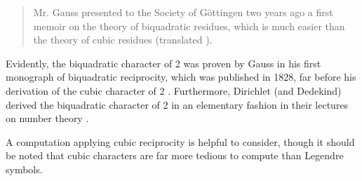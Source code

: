 \documentclass[10pt]{amsart}
\theoremstyle{plain}
\theoremstyle{definition}
\theoremstyle{remark}
\numberwithin{equation}{section}
\begin{document}
\begin{quote}
    Mr. Gauss presented to the Society of Göttingen two years ago a first memoir on the theory of biquadratic residues, which is much easier than the theory of cubic residues \cite{Jacobi1827-yn} (translated \cite[pg. 224]{lemmermeyer2000reciprocity}).
\end{quote}

Evidently, the biquadratic character of 2 was proven by Gauss in his first monograph of biquadratic reciprocity, which was published in 1828, far before his derivation of the cubic character of 2 \cite{gauss1876biquadraticmono}. Furthermore, Dirichlet (and Dedekind) derived the biquadratic character of 2 in an elementary fashion in their lectures on number theory \cite{dirichlet1863vorlesungen}.

\indent A computation applying cubic reciprocity is helpful to consider, though it should be noted that cubic characters are far more tedious to compute than Legendre symbols. 
\end{document}
